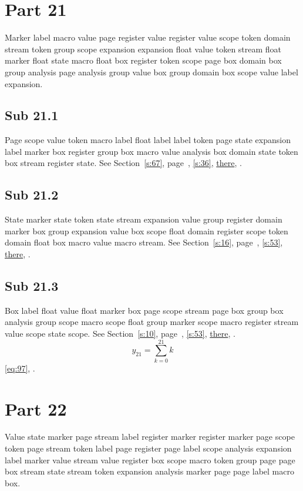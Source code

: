\documentclass[11pt]{article}
\begin{document}
\section{Part 21}\label{s:21}
Marker label macro value page register value register value scope token domain stream token group scope expansion expansion float value token stream float marker float state macro float box register token scope page box domain box group analysis page analysis group value box group domain box scope value label expansion.
\subsection{Sub 21.1}\label{ss:21.1} Page scope value token macro label float label label token page state expansion label marker box register group box macro value analysis box domain state token box stream register state. See Section~\ref{s:67}, page~\pageref{ss:33.1}, \cref{s:36}, \hyperref[s:48]{there}, \cite{k70,k91}.
\subsection{Sub 21.2}\label{ss:21.2} State marker state token state stream expansion value group register domain marker box group expansion value box scope float domain register scope token domain float box macro value macro stream. See Section~\ref{s:16}, page~\pageref{ss:75.3}, \cref{s:53}, \hyperref[s:34]{there}, \cite{k100,k40}.
\subsection{Sub 21.3}\label{ss:21.3} Box label float value float marker box page scope stream page box group box analysis group scope macro scope float group marker scope macro register stream value scope state scope. See Section~\ref{s:10}, page~\pageref{ss:64.2}, \cref{s:53}, \hyperref[s:6]{there}, \cite{k91,k87}.
\begin{equation}y_{21}=\sum_{k=0}^{21}k\label{eq:21}\end{equation} \eqref{eq:97}, .
\section{Part 22}\label{s:22}
Value state marker page stream label register marker register marker page scope token page stream token label page register page label scope analysis expansion label marker value stream value register box scope macro token group page page box stream state stream token expansion analysis marker page page label macro box.
\end{document}
